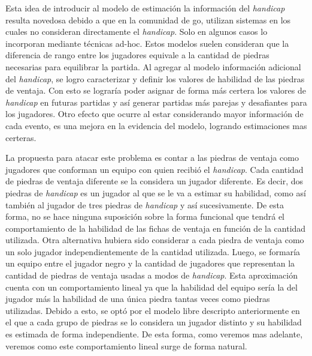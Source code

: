\documentclass[11pt,twoside, spanish]{report} %
\begin{document}
Esta idea de introducir al modelo de estimaci\'on la informaci\'on del \textit{handicap} resulta novedosa debido a que en la comunidad de go, utilizan sistemas en los cuales no consideran directamente el \emph{handicap}.
Solo en algunos casos lo incorporan mediante t\'ecnicas ad-hoc.
Estos modelos suelen consideran que la diferencia de rango entre los jugadores equivale a la cantidad de piedras necesarias para equilibrar la partida.
Al agregar al modelo informaci\'on adicional del \textit{handicap}, se logro caracterizar y definir los valores de habilidad de las piedras de ventaja.
Con esto se lograr\'ia poder asignar de forma m\'as certera los valores de \textit{handicap} en futuras partidas y as\'i generar partidas  m\'as parejas y desafiantes para los jugadores.
Otro efecto que ocurre al estar considerando mayor informaci\'on de cada evento, es una mejora en la evidencia del modelo, logrando estimaciones mas certeras.




La propuesta para atacar este problema es contar a las piedras de ventaja como jugadores que conforman un equipo con quien recibi\'o el \emph{handicap}.
Cada cantidad de piedras de ventaja diferente se la considera un jugador diferente.
Es decir, dos piedras de \textit{handicap} es un jugador al que se le va a estimar su habilidad, como as\'i tambi\'en al jugador de tres piedras de \textit{handicap} y as\'i sucesivamente.
De esta forma, no se hace ninguna suposici\'on sobre la forma funcional que tendr\'a el comportamiento de la habilidad de las fichas de ventaja en funci\'on de la cantidad utilizada.
Otra alternativa hubiera sido considerar a cada piedra de ventaja como un solo jugador independientemente de la cantidad utilizada. 
Luego, se formar\'ia un equipo entre el jugador negro y la cantidad de jugadores que representan la cantidad de piedras de ventaja usadas a modos de \textit{handicap}.
Esta aproximaci\'on cuenta con un comportamiento lineal ya que la habilidad del equipo ser\'ia la del jugador m\'as la habilidad de una \'unica piedra tantas veces como piedras utilizadas.
Debido a esto, se opt\'o por el modelo libre descripto anteriormente en el que a cada grupo de piedras se lo considera un jugador distinto y su habilidad es estimada de forma independiente.
De esta forma, como veremos mas adelante, veremos como este comportamiento lineal surge de forma natural.
\end{document}
